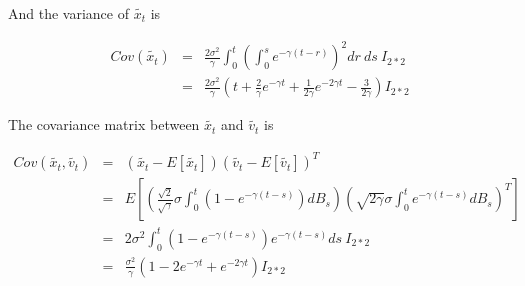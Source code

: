 And the variance of $\tilde{x_t}$ is 

$$
\begin{array}{lcl}
Cov(\tilde{x_t}) & = & \frac{2\sigma^2}{\gamma}\int_0^t(\int_0^se^{-\gamma(t-r)})^2dr \ ds \ I_{2*2} \\
& = & \frac{2\sigma^2}{\gamma}(t+ \frac{2}{\gamma}e^{-\gamma t} + \frac{1}{2\gamma}e^{-2\gamma t} - \frac{3}{2\gamma})I_{2*2}
\end{array}
$$

The covariance matrix between $\tilde{x_t}$ and $\tilde{v_t}$ is 

$$
\begin{array}{lcl}
    Cov(\tilde{x_t}, \tilde{v_t}) & = & (\tilde{x_t}-E[\tilde{x_t}])(\tilde{v_t}-E[\tilde{v_t}])^T \\
    &=& E[(\frac{\sqrt{2}}{\sqrt{\gamma}}\sigma \int_0^t(1-e^{-\gamma(t-s)})dB_s)(\sqrt{2 \gamma}\sigma \int_0^te^{-\gamma (t-s)}dB_s)^T] \\
    &=& 2 \sigma^2\int_0^t(1-e^{-\gamma(t-s)})e^{-\gamma(t-s)}ds \ I_{2*2} \\
    &=& \frac{\sigma^2}{\gamma}(1-2e^{-\gamma t} + e^{-2\gamma t})I_{2*2}
\end{array}
$$


